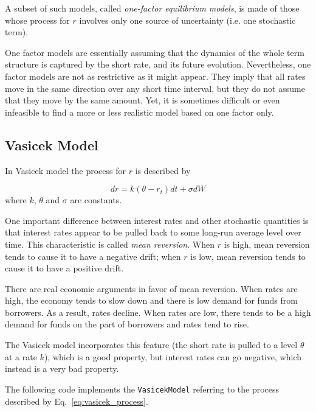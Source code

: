 A subset of such models, called \emph{one-factor equilibrium models}, is made of those whose process for $r$ involves only one source of uncertainty (i.e. one stochastic term). 

One factor models are essentially assuming that the dynamics of the whole term structure is captured by the short rate, and its future evolution. Nevertheless, one factor models are not as restrictive as it might appear. They imply that all rates move in the same direction over any short time interval, but they do not assume that they move by the same amount. Yet, it is sometimes difficult or even infeasible to find a more or less realistic model based on one factor only.

\subsection{Vasicek Model}\label{vasicek-model}

In Vasicek model the process for $r$ is described by

\begin{equation}
dr = k(\theta - r_t)dt + \sigma dW
\label{eq:vasicek_process}
\end{equation}
where \(k\), \(\theta\) and \(\sigma\) are constants.

One important difference between interest rates and other stochastic quantities is that interest rates appear to be pulled back to some long-run average level over time. This characteristic is called \emph{mean reversion}. When $r$ is high, mean reversion tends to cause it to have a negative drift; when $r$ is low, mean reversion tends to cause it to have a positive drift.

There are real economic arguments in favor of mean reversion. When rates are high, the economy tends to slow down and there is low demand for funds from borrowers. As a result, rates decline. When rates are low, there tends to be a high demand for funds on the part of borrowers and rates tend to rise.

The Vasicek model incorporates this feature (the short rate is pulled to a level $\theta$ at a rate $k$), which is a good property, but interest rates can go negative, which instead is a very bad property.

\begin{finmarkets}
The following code implements the \texttt{VasicekModel} referring to the process described by Eq.~\ref{eq:vasicek_process}.
\end{finmarkets}

